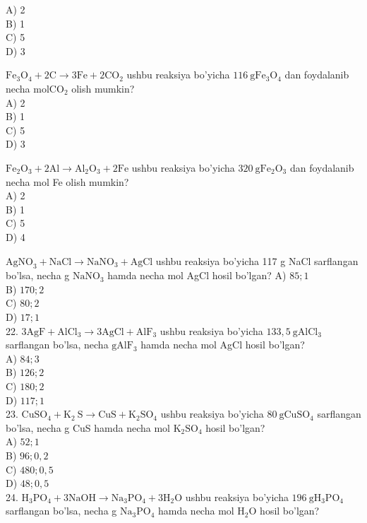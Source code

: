 A) 2\\
B) 1\\
C) 5\\
D) 3
  \item $\mathrm{Fe}_{3} \mathrm{O}_{4}+2 \mathrm{C} \rightarrow 3 \mathrm{Fe}+2 \mathrm{CO}_{2}$ ushbu reaksiya bo'yicha $116 \mathrm{~g} \mathrm{Fe}_{3} \mathrm{O}_{4}$ dan foydalanib necha $\mathrm{mol} \mathrm{CO}_{2}$ olish mumkin?\\
A) 2\\
B) 1\\
C) 5\\
D) 3
  \item $\mathrm{Fe}_{2} \mathrm{O}_{3}+2 \mathrm{Al} \rightarrow \mathrm{Al}_{2} \mathrm{O}_{3}+2 \mathrm{Fe}$ ushbu reaksiya bo'yicha $320 \mathrm{~g} \mathrm{Fe}_{2} \mathrm{O}_{3}$ dan foydalanib necha mol Fe olish mumkin?\\
A) 2\\
B) 1\\
C) 5\\
D) 4
  \item $\mathrm{AgNO}_{3}+\mathrm{NaCl} \rightarrow \mathrm{NaNO}_{3}+\mathrm{AgCl}$ ushbu reaksiya bo'yicha 117 g NaCl sarflangan bo'lsa, necha g $\mathrm{NaNO}_{3}$ hamda necha mol AgCl hosil bo'lgan?
A) $85 ; 1$\\
B) $170 ; 2$\\
C) $80 ; 2$\\
D) $17 ; 1$\\
22. $3 \mathrm{AgF}+\mathrm{AlCl}_{3} \rightarrow 3 \mathrm{AgCl}+\mathrm{AlF}_{3}$ ushbu reaksiya bo'yicha $133,5 \mathrm{~g} \mathrm{AlCl}_{3}$ sarflangan bo'lsa, necha $\mathrm{g} \mathrm{AlF}_{3}$ hamda necha mol AgCl hosil bo'lgan?\\
A) $84 ; 3$\\
B) $126 ; 2$\\
C) $180 ; 2$\\
D) $117 ; 1$\\
23. $\mathrm{CuSO}_{4}+\mathrm{K}_{2} \mathrm{~S} \rightarrow \mathrm{CuS}+\mathrm{K}_{2} \mathrm{SO}_{4}$ ushbu reaksiya bo'yicha $80 \mathrm{~g} \mathrm{CuSO}_{4}$ sarflangan bo'lsa, necha g CuS hamda necha mol $\mathrm{K}_{2} \mathrm{SO}_{4}$ hosil bo'lgan?\\
A) $52 ; 1$\\
B) $96 ; 0,2$\\
C) $480 ; 0,5$\\
D) $48 ; 0,5$\\
24. $\mathrm{H}_{3} \mathrm{PO}_{4}+3 \mathrm{NaOH} \rightarrow \mathrm{Na}_{3} \mathrm{PO}_{4}+3 \mathrm{H}_{2} \mathrm{O}$ ushbu reaksiya bo'yicha $196 \mathrm{~g} \mathrm{H}_{3} \mathrm{PO}_{4}$ sarflangan bo'lsa, necha g $\mathrm{Na}_{3} \mathrm{PO}_{4}$ hamda necha mol $\mathrm{H}_{2} \mathrm{O}$ hosil bo'lgan?\\
